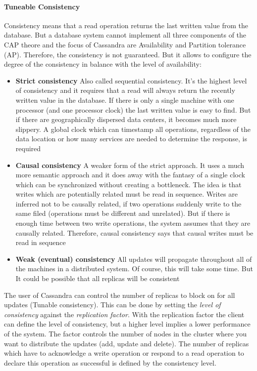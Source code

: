 \documentclass[a4paper]{article}
\begin{document}
\paragraph{Tuneable Consistency}
Consistency means that a read operation returns the last written value from the database. But a database system cannot implement all three components of the CAP theore and the focus of Cassandra are Availability and Partition tolerance (AP). Therefore, the consistency is not guaranteed. But it allows to configure the degree of the consistency in balance with the level of availability: 
\begin{itemize}
	\item \textbf{Strict consistency} Also called sequential consistency. It's the highest level of consistency and it requires that a read will always return the recently written value in the database. If there is only a single machine with one processor (and one processor clock) the last written value is easy to find. But if there are geographically dispersed data centers, it becomes much more slippery. A global clock which can timestamp all operations, regardless of the data location or how many services are needed to determine the response, is required 
	\item \textbf{Causal consistency} A weaker form of the strict approach. It uses a much more semantic approach and it does away with the fantasy of a single clock which can be synchronized without creating a bottleneck. The idea is that writes which are potentially related must be read in sequence. Writes are inferred not to be causally related, if two operations suddenly write to the same filed (operations must be different and unrelated). But if there is enough time between two write operations, the system assumes that they are causally related. Therefore, causal consistency says that causal writes must be read in sequence 
	\item \textbf{Weak (eventual) consistency} All updates will propagate throughout all of the machines in a distributed system. Of course, this will take some time. But It could be possible that all replicas will be consistent 
\end{itemize}
The user of Cassandra can control the number of replicas to block on for all updates (Tunable consistency). This can be done by setting the \textit{level of consistency} against the \textit{replication factor}. With the replication factor the client can define the level of consistency, but a higher level implies a lower performance of the system. The factor controls the number of nodes in the cluster where you want to distribute the updates (add, update and delete). The number of replicas which have to acknowledge a write operation or respond to a read operation to declare this operation as successful is defined by the consistency level.
\end{document}
